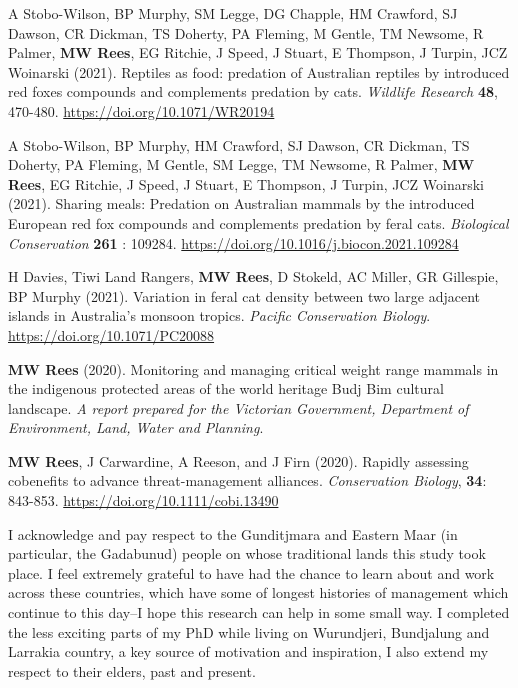 \documentclass[11pt,a4paper,titlepage,twoside,openright]{style/unimelbthesis}
\begin{document}
\begin{frontmatter}
\begin{preface}
    A Stobo-Wilson, BP Murphy, SM Legge, DG Chapple, HM Crawford, SJ Dawson, CR Dickman, TS Doherty, PA Fleming, M Gentle, TM Newsome, R Palmer, \textbf{MW Rees}, EG Ritchie, J Speed, J Stuart, E Thompson, J Turpin, JCZ Woinarski (2021). Reptiles as food: predation of Australian reptiles by introduced red foxes compounds and complements predation by cats. \emph{Wildlife Research} \textbf{48}, 470-480. \url{https://doi.org/10.1071/WR20194}
    
    A Stobo-Wilson, BP Murphy, HM Crawford, SJ Dawson, CR Dickman, TS Doherty, PA Fleming, M Gentle, SM Legge, TM Newsome, R Palmer, \textbf{MW Rees}, EG Ritchie, J Speed, J Stuart, E Thompson, J Turpin, JCZ Woinarski (2021). Sharing meals: Predation on Australian mammals by the introduced European red fox compounds and complements predation by feral cats. \emph{Biological Conservation} \textbf{261} : 109284. \url{https://doi.org/10.1016/j.biocon.2021.109284}
    
    H Davies, Tiwi Land Rangers, \textbf{MW Rees}, D Stokeld, AC Miller, GR Gillespie, BP Murphy (2021). Variation in feral cat density between two large adjacent islands in Australia's monsoon tropics. \emph{Pacific Conservation Biology}. \url{https://doi.org/10.1071/PC20088}
    
    \textbf{MW Rees} (2020). Monitoring and managing critical weight range mammals in the indigenous protected areas of the world heritage Budj Bim cultural landscape. \emph{A report prepared for the Victorian Government, Department of Environment, Land, Water and Planning}.
    
    \textbf{MW Rees}, J Carwardine, A Reeson, and J Firn (2020). Rapidly assessing cobenefits to advance threat-management alliances. \emph{Conservation Biology}, \textbf{34}: 843-853. \url{https://doi.org/10.1111/cobi.13490}
  \end{preface}
  \begin{acknowledgements}
    I acknowledge and pay respect to the Gunditjmara and Eastern Maar (in particular, the Gadabunud) people on whose traditional lands this study took place. I feel extremely grateful to have had the chance to learn about and work across these countries, which have some of longest histories of management which continue to this day--I hope this research can help in some small way. I completed the less exciting parts of my PhD while living on Wurundjeri, Bundjalung and Larrakia country, a key source of motivation and inspiration, I also extend my respect to their elders, past and present.
    

\end{acknowledgements}
\end{frontmatter}
\end{document}
